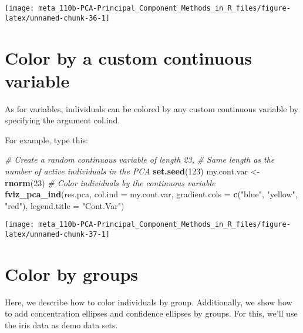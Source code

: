 \documentclass[]{book}
\newenvironment{Shaded}{\begin{snugshade}}{\end{snugshade}}
\newcommand{\CommentTok}[1]{\textcolor[rgb]{0.56,0.35,0.01}{\textit{#1}}}
\newcommand{\DataTypeTok}[1]{\textcolor[rgb]{0.13,0.29,0.53}{#1}}
\newcommand{\DecValTok}[1]{\textcolor[rgb]{0.00,0.00,0.81}{#1}}
\newcommand{\KeywordTok}[1]{\textcolor[rgb]{0.13,0.29,0.53}{\textbf{#1}}}
\newcommand{\NormalTok}[1]{#1}
\newcommand{\StringTok}[1]{\textcolor[rgb]{0.31,0.60,0.02}{#1}}
\begin{document}
\begin{center}\texttt{[image: meta\_110b-PCA-Principal\_Component\_Methods\_in\_R\_files/figure-latex/unnamed-chunk-36-1]} \end{center}

\hypertarget{color-by-a-custom-continuous-variable-1}{%
\section{Color by a custom continuous variable}\label{color-by-a-custom-continuous-variable-1}}

As for variables, individuals can be colored by any custom continuous variable by specifying the argument col.ind.

For example, type this:

\begin{Shaded}
\begin{Highlighting}[]
\CommentTok{# Create a random continuous variable of length 23,}
\CommentTok{# Same length as the number of active individuals in the PCA}
\KeywordTok{set.seed}\NormalTok{(}\DecValTok{123}\NormalTok{)}
\NormalTok{my.cont.var <-}\StringTok{ }\KeywordTok{rnorm}\NormalTok{(}\DecValTok{23}\NormalTok{)}
\CommentTok{# Color individuals by the continuous variable}
\KeywordTok{fviz_pca_ind}\NormalTok{(res.pca, }\DataTypeTok{col.ind =}\NormalTok{ my.cont.var,}
             \DataTypeTok{gradient.cols =} \KeywordTok{c}\NormalTok{(}\StringTok{"blue"}\NormalTok{, }\StringTok{"yellow"}\NormalTok{, }\StringTok{"red"}\NormalTok{),}
             \DataTypeTok{legend.title =} \StringTok{"Cont.Var"}\NormalTok{)}
\end{Highlighting}
\end{Shaded}

\begin{center}\texttt{[image: meta\_110b-PCA-Principal\_Component\_Methods\_in\_R\_files/figure-latex/unnamed-chunk-37-1]} \end{center}

\hypertarget{color-by-groups-1}{%
\section{Color by groups}\label{color-by-groups-1}}

Here, we describe how to color individuals by group. Additionally, we show how to add concentration ellipses and confidence ellipses by groups. For this, we'll use the iris data as demo data sets.
\end{document}
